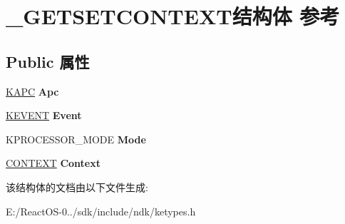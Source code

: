 \hypertarget{struct___g_e_t_s_e_t_c_o_n_t_e_x_t}{}\section{\+\_\+\+G\+E\+T\+S\+E\+T\+C\+O\+N\+T\+E\+X\+T结构体 参考}
\label{struct___g_e_t_s_e_t_c_o_n_t_e_x_t}
\subsection*{Public 属性}
\begin{DoxyCompactItemize}
\item 
\mbox{\label{struct___g_e_t_s_e_t_c_o_n_t_e_x_t_a2275779eac6e1c7ea7733179b2fbad73}} 
\hyperlink{struct___k_a_p_c}{K\+A\+PC} {\bfseries Apc}
\item 
\mbox{\label{struct___g_e_t_s_e_t_c_o_n_t_e_x_t_a9e575b929871426c647b4505993ceabf}} 
\hyperlink{struct___k_e_v_e_n_t}{K\+E\+V\+E\+NT} {\bfseries Event}
\item 
\mbox{\label{struct___g_e_t_s_e_t_c_o_n_t_e_x_t_a7be21e620f7c07d05b04a3a101972331}} 
K\+P\+R\+O\+C\+E\+S\+S\+O\+R\+\_\+\+M\+O\+DE {\bfseries Mode}
\item 
\mbox{\label{struct___g_e_t_s_e_t_c_o_n_t_e_x_t_a2074178aae8a2057992769f31cddd926}} 
\hyperlink{struct___c_o_n_t_e_x_t}{C\+O\+N\+T\+E\+XT} {\bfseries Context}
\end{DoxyCompactItemize}


该结构体的文档由以下文件生成\+:\begin{DoxyCompactItemize}
\item 
E\+:/\+React\+O\+S-\/0../sdk/include/ndk/ketypes.\+h\end{DoxyCompactItemize}
